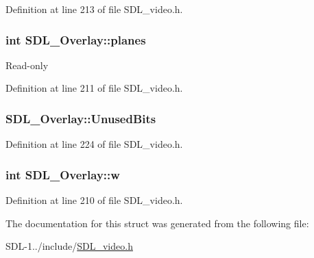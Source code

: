 Definition at line 213 of file S\+D\+L\+\_\+video.\+h.

\hypertarget{struct_s_d_l___overlay_ab91d676ef6310197aa189c469be3d50a}{}
\subsubsection[{planes}]{\setlength{\rightskip}{0pt plus 5cm}int S\+D\+L\+\_\+\+Overlay\+::planes}\label{struct_s_d_l___overlay_ab91d676ef6310197aa189c469be3d50a}
Read-\/only 

Definition at line 211 of file S\+D\+L\+\_\+video.\+h.

\hypertarget{struct_s_d_l___overlay_a3dff6185e5d7cba5455b17cbf96d23ed}{}
\subsubsection[{Unused\+Bits}]{ S\+D\+L\+\_\+\+Overlay\+::\+Unused\+Bits}\label{struct_s_d_l___overlay_a3dff6185e5d7cba5455b17cbf96d23ed}


Definition at line 224 of file S\+D\+L\+\_\+video.\+h.

\hypertarget{struct_s_d_l___overlay_a8a73fe76717c183d52dd67a6981fd84d}{}
\subsubsection[{w}]{\setlength{\rightskip}{0pt plus 5cm}int S\+D\+L\+\_\+\+Overlay\+::w}\label{struct_s_d_l___overlay_a8a73fe76717c183d52dd67a6981fd84d}


Definition at line 210 of file S\+D\+L\+\_\+video.\+h.



The documentation for this struct was generated from the following file\+:\begin{DoxyCompactItemize}
\item 
S\+D\+L-\/1../include/\hyperlink{_s_d_l__video_8h}{S\+D\+L\+\_\+video.\+h}\end{DoxyCompactItemize}
